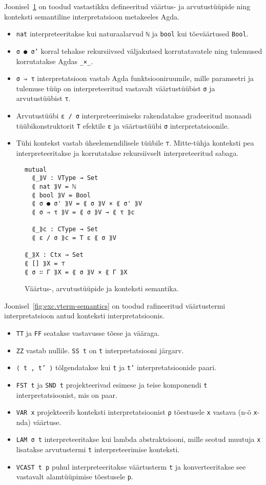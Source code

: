 \documentclass[a4paper,12pt]{article}
\begin{document}
Joonisel~\ref{fig:type-semantics} on toodud vastastikku defineeritud väärtus- ja arvutustüüpide ning konteksti semantiline interpretatsioon metakeeles Agda.
\begin{itemize}
\item {\tt nat} interpreteeritakse kui naturaalarvud {\tt ℕ} ja {\tt bool} kui tõeväärtused {\tt Bool}.
\item {\tt σ ● σ'} korral tehakse rekursiivsed väljakutsed korrutatavatele ning tulemused korrutatakse Agdas {\tt _×_}.
\item {\tt σ ⇒ τ} interpretatsioon vastab Agda funktsiooniruumile, mille parameetri ja tulemuse tüüp on interpreteeritud vastavalt väärtustüübist {\tt σ} ja arvutustüübist {\tt τ}.
\item Arvutustüübi {\tt ε / σ} interpreteerimiseks rakendatakse gradeeritud monaadi tüübikonstruktorit {\tt T} efektile {\tt ε} ja väärtustüübi {\tt σ} interpretatsioonile.
\item Tühi kontekst vastab üheelemendilisele tüübile {\tt ⊤}. Mitte-tühja konteksti pea interpreteeritakse ja korrutatakse rekursiivselt interpreteeritud sabaga.
\end{itemize}

\begin{figure}
  \begin{BVerbatim}
mutual
  ⟪_⟫V : VType → Set
  ⟪ nat ⟫V = ℕ
  ⟪ bool ⟫V = Bool
  ⟪ σ ● σ' ⟫V = ⟪ σ ⟫V × ⟪ σ' ⟫V
  ⟪ σ ⇒ τ ⟫V = ⟪ σ ⟫V → ⟪ τ ⟫c

  ⟪_⟫c : CType → Set
  ⟪ ε / σ ⟫c = T ε ⟪ σ ⟫V

⟪_⟫X : Ctx → Set
⟪ [] ⟫X = ⊤
⟪ σ ∷ Γ ⟫X = ⟪ σ ⟫V × ⟪ Γ ⟫X
  \end{BVerbatim}
  \caption{Väärtus-, arvutustüüpide ja konteksti semantika.}
  \label{fig:type-semantics}
\end{figure}

Joonisel~\ref{fig:exc.vterm-semantics} on toodud rafineeritud väärtustermi interpretatsioon antud konteksti interpretatsioonis.
\begin{itemize}
\item {\tt TT} ja {\tt FF} seatakse vastavusse tõese ja vääraga.
\item {\tt ZZ} vastab nullile. {\tt SS t} on {\tt t} interpretatsiooni järgarv.
\item {\tt ⟨ t , t' ⟩} tõlgendatakse kui {\tt t} ja {\tt t'} interpretatsioonide paari.
\item {\tt FST t} ja {\tt SND t} projekteerivad esimese ja teise komponendi {\tt t} interpretatsioonist, mis on paar.
\item {\tt VAR x} projekteerib konteksti interpretatsioonist {\tt ρ} tõestusele {\tt x} vastava (n-ö {\tt x}-nda) väärtuse.
\item {\tt LAM σ t} interpreteeritakse kui lambda abstraktsiooni, mille seotud muutuja {\tt x} lisatakse arvutustermi {\tt t} interpreteerimise konteksti.
\item {\tt VCAST t p} puhul interpreteeritakse väärtusterm {\tt t} ja konverteeritakse see vastavalt alamtüüpimise tõestusele {\tt p}.
\end{itemize}
\end{document}
